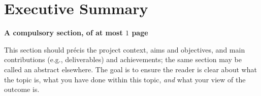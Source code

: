 \documentclass[ draft,
                    author={Alexander Hill},
                supervisor={Dr. Benjamin Sach},
                    degree={MEng},
                     title={MARMOSET: Multi Agent Real-time Multi-core Online
                     Simulation for Efficient Transportation},
                  subtitle={},
                      type={research},
                      year={2016} ]{dissertation}
\begin{document}


\maketitle


\frontmatter


\makedecl


\tableofcontents
\listoffigures
\listoftables
\listofalgorithms
\lstlistoflistings



\chapter*{Executive Summary}

{\bf A compulsory section, of at most $1$ page}
\vspace{1cm}

\noindent
This section should pr\'{e}cis the project context, aims and objectives,
and main contributions (e.g., deliverables) and achievements; the same
section may be called an abstract elsewhere.  The goal is to ensure the
reader is clear about what the topic is, what you have done within this
topic, {\em and} what your view of the outcome is.
\end{document}
